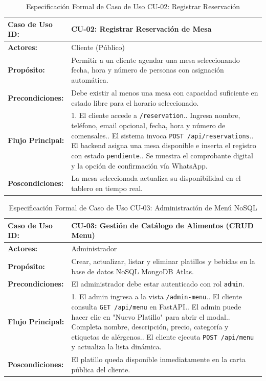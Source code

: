 \documentclass[12pt,a4paper]{article}
\begin{document}
\begin{table}[H]\small\centering
\caption{Especificación Formal de Caso de Uso CU-02: Registrar Reservación}
\begin{tabular}{|l|p{11cm}|}
\hline
\textbf{Caso de Uso ID:} & \textbf{CU-02: Registrar Reservación de Mesa} \\ \hline
\textbf{Actores:} & Cliente (Público) \\ \hline
\textbf{Propósito:} & Permitir a un cliente agendar una mesa seleccionando fecha, hora y número de personas con asignación automática. \\ \hline
\textbf{Precondiciones:} & Debe existir al menos una mesa con capacidad suficiente en estado libre para el horario seleccionado. \\ \hline
\textbf{Flujo Principal:} & 
1. El cliente accede a \texttt{/reservation}.\newline
2. Ingresa nombre, teléfono, email opcional, fecha, hora y número de comensales.\newline
3. El sistema invoca \texttt{POST /api/reservations}.\newline
4. El backend asigna una mesa disponible e inserta el registro con estado \texttt{pendiente}.\newline
5. Se muestra el comprobante digital y la opción de confirmación vía WhatsApp. \\ \hline
\textbf{Poscondiciones:} & La mesa seleccionada actualiza su disponibilidad en el tablero en tiempo real. \\ \hline
\end{tabular}
\end{table}

\begin{table}[H]\small\centering
\caption{Especificación Formal de Caso de Uso CU-03: Administración de Menú NoSQL}
\begin{tabular}{|l|p{11cm}|}
\hline
\textbf{Caso de Uso ID:} & \textbf{CU-03: Gestión de Catálogo de Alimentos (CRUD Menu)} \\ \hline
\textbf{Actores:} & Administrador \\ \hline
\textbf{Propósito:} & Crear, actualizar, listar y eliminar platillos y bebidas en la base de datos NoSQL MongoDB Atlas. \\ \hline
\textbf{Precondiciones:} & El administrador debe estar autenticado con rol \texttt{admin}. \\ \hline
\textbf{Flujo Principal:} & 
1. El admin ingresa a la vista \texttt{/admin-menu}.\newline
2. El cliente consulta \texttt{GET /api/menu} en FastAPI.\newline
3. El admin puede hacer clic en "Nuevo Platillo" para abrir el modal.\newline
4. Completa nombre, descripción, precio, categoría y etiquetas de alérgenos.\newline
5. El cliente ejecuta \texttt{POST /api/menu} y actualiza la lista dinámica. \\ \hline
\textbf{Poscondiciones:} & El platillo queda disponible inmediatamente en la carta pública del cliente. \\ \hline
\end{tabular}
\end{table}
\end{document}
